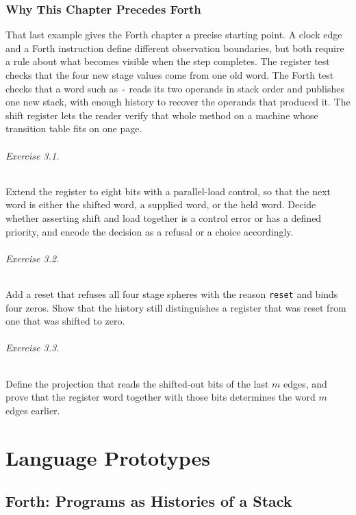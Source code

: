 \documentclass[11pt,oneside]{report}
\theoremstyle{plain}
\theoremstyle{definition}
\theoremstyle{remark}
\newcommand{\transcript}[1]{}
\begin{document}
\transcript{regs}

\section{Why This Chapter Precedes Forth}

That last example gives the Forth chapter a precise starting point. A clock edge and a Forth instruction define different observation boundaries, but both require a rule about what becomes visible when the step completes. The register test checks that the four new stage values come from one old word. The Forth test checks that a word such as \texttt{-} reads its two operands in stack order and publishes one new stack, with enough history to recover the operands that produced it. The shift register lets the reader verify that whole method on a machine whose transition table fits on one page.

\paragraph{Exercise 3.1.} Extend the register to eight bits with a parallel-load control, so that the next word is either the shifted word, a supplied word, or the held word. Decide whether asserting shift and load together is a control error or has a defined priority, and encode the decision as a refusal or a choice accordingly.

\paragraph{Exercise 3.2.} Add a reset that refuses all four stage spheres with the reason \texttt{reset} and binds four zeros. Show that the history still distinguishes a register that was reset from one that was shifted to zero.

\paragraph{Exercise 3.3.} Define the projection that reads the shifted-out bits of the last $m$ edges, and prove that the register word together with those bits determines the word $m$ edges earlier.
\part{Language Prototypes}

\chapter{Forth: Programs as Histories of a Stack}
\end{document}
